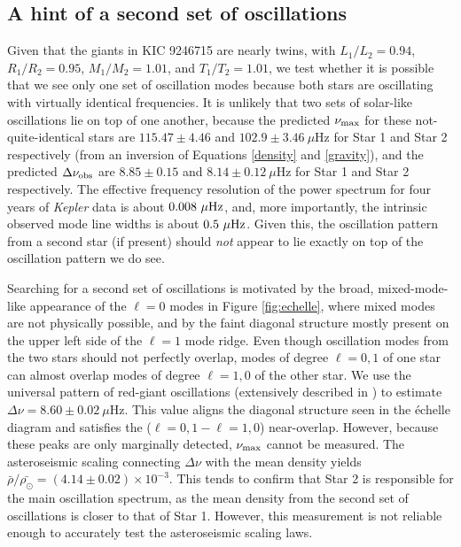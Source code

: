 \subsection{A hint of a second set of oscillations}\label{search}
\label{subsubsec_second_osc}

Given that the giants in KIC 9246715 are nearly twins, with $L_1/L_2 = 0.94$, $R_1/R_2 = 0.95$, $M_1/M_2 = 1.01$, and $T_1/T_2 = 1.01$, we test whether it is possible that we see only one set of oscillation modes because both stars are oscillating with virtually identical frequencies. It is unlikely that two sets of solar-like oscillations lie on top of one another, because the predicted $\nu_{\rm{max}}$ for these not-quite-identical stars are $115.47 \pm 4.46$ and $102.9 \pm 3.46\ \mu$Hz for Star 1 and Star 2 respectively (from an inversion of Equations \ref{density} and \ref{gravity}), and the predicted $\Delta\nu_{\rm{obs}}$ are $8.85 \pm 0.15$ and $8.14 \pm 0.12 \ \mu$Hz for Star 1 and Star 2 respectively. The effective frequency resolution of the power spectrum for four years of \emph{Kepler} data is about $0.008 \ \mu \rm{Hz}$, and, more importantly, the intrinsic observed mode line widths is about $0.5 \ \mu \rm{Hz}$. Given this, the oscillation pattern from a second star (if present) should \emph{not} appear to lie exactly on top of the oscillation pattern we do see.

Searching for a second set of oscillations is motivated by the broad, mixed-mode-like appearance of the $\ell=0$ modes in Figure \ref{fig:echelle}, where mixed modes are not physically possible, and by the faint diagonal structure mostly present on the upper left side of the $\ell=1$ mode ridge. Even though oscillation modes from the two stars should not perfectly overlap, modes of degree $\ell=0,1$ of one star can almost overlap modes of degree $\ell=1,0$ of the other star. We use the universal pattern of red-giant oscillations (extensively described in \citealt{mos11}) to estimate $\Delta \nu = 8.60 \pm 0.02\ \mu$Hz. This value aligns the diagonal structure seen in the \'echelle diagram and satisfies the ($\ell=0,1-\ell=1,0$) near-overlap. However, because these peaks are only marginally detected, $\nu_{\rm{max}}$ cannot be measured. The asteroseismic scaling connecting $\Delta\nu$ with the mean density yields $\bar{\rho}/\bar{\rho_\odot} = (4.14 \pm 0.02)\times 10^{-3}$. This tends to confirm that Star 2 is responsible for the main oscillation spectrum, as the mean density from the second set of oscillations is closer to that of Star 1. However, this measurement is not reliable enough to accurately test the asteroseismic scaling laws.

